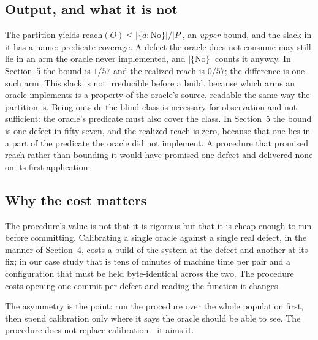 \subsection{Output, and what it is not}

The partition yields $\mathrm{reach}(O) \le |\{d : \text{No}\}| / |P|$, an
\emph{upper} bound, and the slack in it has a name: predicate coverage. A defect the
oracle does not consume may still lie in an arm the oracle never implemented, and
$|\{\text{No}\}|$ counts it anyway. In Section~5 the bound is $1/57$ and the
realized reach is $0/57$; the difference is one such arm. This slack is not
irreducible before a build, because which arms an oracle implements is a property
of the oracle's source, readable the same way the partition is. Being outside the
blind class is necessary for observation and
not sufficient: the oracle's predicate must also cover the class. In Section~5 the
bound is one defect in fifty-seven, and the realized reach is zero, because that one
lies in a part of the predicate the oracle did not implement. A procedure that
promised reach rather than bounding it would have promised one defect and delivered
none on its first application.

\subsection{Why the cost matters}

The procedure's value is not that it is rigorous but that it is cheap enough to run
before committing. Calibrating a single oracle against a single real defect, in the
manner of Section~4, costs a build of the system at the defect and another at its
fix; in our case study that is tens of minutes of machine time per pair and a
configuration that must be held byte-identical across the two. The procedure costs
opening one commit per defect and reading the function it changes.

The asymmetry is the point: run the procedure over the whole population first, then
spend calibration only where it says the oracle should be able to see. The procedure
does not replace calibration---it aims it.
